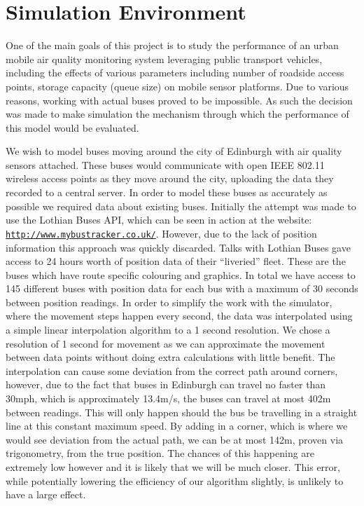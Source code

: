 \chapter{Simulation Environment}\label{simulation}
    
    One of the main goals of this project is to study the performance of an urban mobile air quality monitoring system leveraging public transport vehicles, including the effects of various parameters including number of roadside access points, storage capacity (queue size) on mobile sensor platforms. Due to various reasons, working with actual buses proved to be impossible. As such the decision was made to make simulation the mechanism through which the performance of this model would be evaluated. 

    We wish to model buses moving around the city of Edinburgh with air quality sensors attached. These buses would communicate with open IEEE 802.11 wireless access points as they move around the city, uploading the data they recorded to a central server. In order to model these buses as accurately as possible we required data about existing buses. Initially the attempt was made to use the Lothian Buses API, which can be seen in action at the website: \href{http://www.mybustracker.co.uk/}{\nolinkurl{http://www.mybustracker.co.uk/}}. However, due to the lack of position information this approach was quickly discarded. Talks with Lothian Buses gave access to 24 hours worth of position data of their ``liveried'' fleet. These are the buses which have route specific colouring and graphics. In total we have access to 145 different buses with position data for each bus with a maximum of 30 seconds between position readings. In order to simplify the work with the simulator, where the movement steps happen every second, the data was interpolated using a simple linear interpolation algorithm to a 1 second resolution. We chose a resolution of 1 second for movement as we can approximate the movement between data points without doing extra calculations with little benefit. The interpolation can cause some deviation from the correct path around corners, however, due to the fact that buses in Edinburgh can travel no faster than 30mph, which is approximately 13.4m/s, the buses can travel at most 402m between readings. This will only happen should the bus be travelling in a straight line at this constant maximum speed. By adding in a corner, which is where we would see deviation from the actual path, we can be at most 142m, proven via trigonometry, from the true position. The chances of this happening are extremely low however and it is likely that we will be much closer. This error, while potentially lowering the efficiency of our algorithm slightly, is unlikely to have a large effect.

